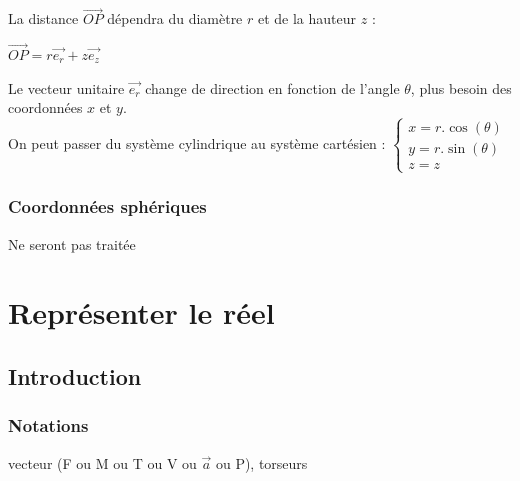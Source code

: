 \documentclass[
	11pt, %
	fleqn, %
	a4paper, %
]{LegrandOrangeBook}
\begin{document}
La distance $\Vec{OP}$ dépendra du diamètre $r$ et de la hauteur $z$ :\\
\begin{center}
$\Vec{OP}=r\Vec{e_r}+z\Vec{e_z}$
\end{center}
Le vecteur unitaire $\Vec{e_r}$ change de direction en fonction de l'angle $\theta$, plus besoin des coordonnées $x$ et $y$. \\
\noindent On peut passer du système cylindrique au système cartésien :
$\begin{cases}
x=r.\cos( \theta )\\
y=r.\sin( \theta )\\
z=z
\end{cases}$


\subsection{Coordonnées sphériques}
Ne seront pas traitée








\chapterspaceabove{6.25cm} %
\chapterspacebelow{7.5cm} %

\chapter{Représenter le réel}

\section{Introduction}









\subsection{Notations}
vecteur (F ou M ou T ou V ou $\Vec{a}$ ou P), torseurs
\end{document}
